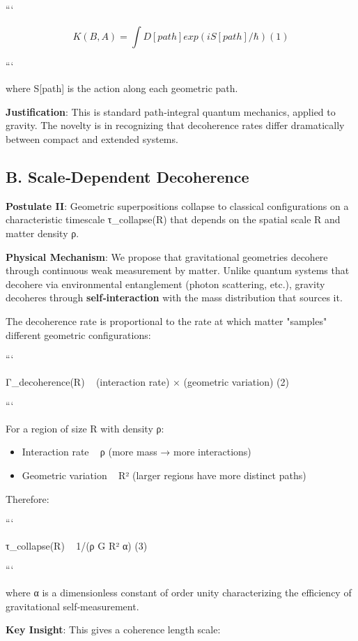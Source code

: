 \documentclass[11pt,a4paper]{article}
\begin{document}
```

\[
K(B,A) = ∫ D[path] exp(iS[path]/ℏ)     (1)
\]

```


where S[path] is the action along each geometric path.


\textbf{Justification}: This is standard path‑integral quantum mechanics, applied to gravity. The novelty is in recognizing that decoherence rates differ dramatically between compact and extended systems.


\subsection{B. Scale‑Dependent Decoherence}


\textbf{Postulate II}: Geometric superpositions collapse to classical configurations on a characteristic timescale τ\_collapse(R) that depends on the spatial scale R and matter density ρ.


\textbf{Physical Mechanism}: We propose that gravitational geometries decohere through continuous weak measurement by matter. Unlike quantum systems that decohere via environmental entanglement (photon scattering, etc.), gravity decoheres through \textbf{self‑interaction} with the mass distribution that sources it.


The decoherence rate is proportional to the rate at which matter "samples" different geometric configurations:


```

Γ\_decoherence(R) ~ (interaction rate) × (geometric variation)     (2)

```


For a region of size R with density ρ:

\begin{itemize}
\item Interaction rate ~ ρ (more mass → more interactions)
\item Geometric variation ~ R² (larger regions have more distinct paths)
\end{itemize}


Therefore:

```

τ\_collapse(R) ~ 1/(ρ G R² α)     (3)

```


where α is a dimensionless constant of order unity characterizing the efficiency of gravitational self‑measurement.


\textbf{Key Insight}: This gives a coherence length scale:
\end{document}
